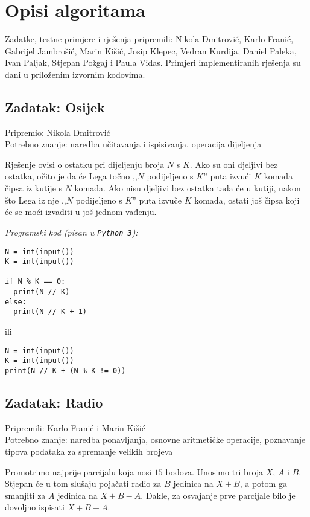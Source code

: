 \documentclass[a4paper]{article}
\begin{document}
\section*{Opisi algoritama}
Zadatke, testne primjere i rješenja pripremili: Nikola Dmitrović, Karlo Franić,
Gabrijel Jambrošić, Marin Kišić, Josip Klepec, Vedran Kurdija, Daniel Paleka,
Ivan Paljak, Stjepan Požgaj i Paula Vidas. Primjeri implementiranih rješenja su
dani u priloženim izvornim kodovima.

\subsection*{Zadatak: Osijek}
\textsf{Pripremio: Nikola Dmitrović}\\
\textsf{Potrebno znanje: naredba učitavanja i ispisivanja, operacija dijeljenja}

Rješenje ovisi o ostatku pri dijeljenju broja $N$ s $K$. Ako su oni djeljivi bez
ostatka, očito je da će Lega točno ,,$N$ podijeljeno s $K$'' puta izvući $K$ komada
čipsa iz kutije s $N$ komada. Ako nisu djeljivi bez ostatka tada će u kutiji,
nakon što Lega iz nje ,,$N$ podijeljeno s $K$'' puta izvuče $K$ komada, ostati još
čipsa koji će se moći izvaditi u još jednom vađenju.

\textit{Programski kod (pisan u \texttt{Python 3}):}

\vspace{-2ex}
\begin{verbatim}
N = int(input())
K = int(input())

if N % K == 0:
  print(N // K)
else:
  print(N // K + 1)
\end{verbatim}

ili

\begin{verbatim}
N = int(input())
K = int(input())
print(N // K + (N % K != 0))
\end{verbatim}

\subsection*{Zadatak: Radio}
\textsf{Pripremili: Karlo Franić i Marin Kišić}\\
\textsf{Potrebno znanje: naredba ponavljanja, osnovne aritmetičke operacije,
poznavanje tipova podataka za spremanje velikih brojeva}

Promotrimo najprije parcijalu koja nosi $15$ bodova. Unosimo tri broja $X$, $A$
i $B$.  Stjepan će u tom slušaju pojačati radio za $B$ jedinica na $X + B$, a
potom ga smanjiti za $A$ jedinica na $X + B - A$. Dakle, za osvajanje prve
parcijale bilo je dovoljno ispisati $X + B - A$.
\end{document}
